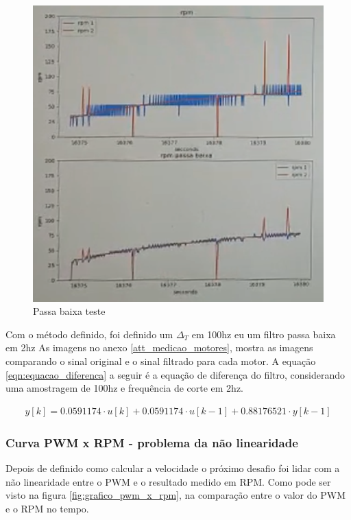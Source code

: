 	\begin{figure}[ht]
		\centering
		\includegraphics{figures/passa_baixa_teste}
		\caption{Passa baixa teste}
		\label{fig:passa_baixa_teste}
	\end{figure}
	
	
	Com o método definido, foi definido um $\Delta_{T}$ em 100hz eu um filtro passa baixa em 2hz
	As imagens no anexo \ref{att_medicao_motores}, mostra as imagens comparando o sinal original e o sinal filtrado para cada motor.
	A equação \ref{eqn:equacao_diferenca} a seguir é a equação de diferença do filtro, considerando uma amostragem de 100hz e frequência de corte em 2hz.
	
	\begin{equation}
		\begin{split}
			y[k] = 0.0591174 \cdot u \left[ k \right] +  0.0591174 \cdot u[k - 1] + 0.88176521 \cdot y[k - 1]
		\end{split}
		\label{eqn:equacao_diferenca}
	\end{equation}
	
	\subsubsection{Curva PWM x RPM - problema da não linearidade}
	
	Depois de definido como calcular a velocidade o próximo desafio foi lidar com a não linearidade entre o PWM e o resultado medido em RPM.
	Como pode ser visto na figura \ref{fig:grafico_pwm_x_rpm}, na comparação entre o valor do PWM e o RPM no tempo.
	
